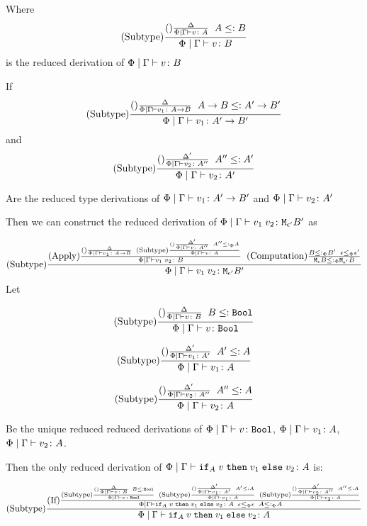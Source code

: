 {    Where $$\edeltavrule{\P}{\G}{v}{A}{B}$$ is the reduced derivation of $\gpetyperelation{v}{B}$
    
    If 
    $$
        \edeltavrule{\P}{\G}{v_1}{\ab}{\fntype{A'}{B'}}
    $$ and $$
        \edeltavruleprime{\P}{\G}{v_2}{A''}{A'}
    $$

    Are the reduced type derivations of $\gpetyperelation{v_1}{\fntype{A'}{B'}}$ and $\gpetyperelation{v_2}{A'}$



    Then we can construct the reduced derivation of $\gpetyperelation{\apply{v_1}{v_2}}{\M{\e'}{B'}}$ as

    $$
        \treerule{Subtype}{
            \treerule{Apply}{
                \treerule{}{\D}{
                    \gpetyperelation{v_1}{\ab}
                }
                \s\s
                \treerule{Subtype}{
                    \treerule{}{\D'}{
                        \gpetyperelation{v}{A''}
                    } \s\s A'' \subtypep A
                }
                {\gpetyperelation{v}{A}}
            }{
                \gpetyperelation{\apply{v_1}{v_2}}{B}
            }
            \s\s
            \treerule{Computation}{         
                B \subtypep B'
            \s\s
            \e \subeffectp \e'}{
                \meb\subtypep\M{\e'}{B}
            }
        }{
            \gpetyperelation{\apply{v_1}{v_2}}{\M{\e'}{B'}}
        }
    $$
    Let

    \begin{equation}
        \edeltavrule{\P}{\G}{v}{B}{\B}
    \end{equation}

    \begin{equation}
        \edeltavruleprime{\P}{\G}{v_1}{A'}{A}
    \end{equation}

    \begin{equation}
        \edeltavruleprimeprime{\P}{\G}{v_2}{A''}{A}
    \end{equation}

    Be the unique reduced reduced derivations of $\gpetyperelation{v}{\B}$, $\gpetyperelation{v_1}{A}$, $\gpetyperelation{v_2}{A}$.

    Then the only reduced derivation of $\gpetyperelation{\pifthenelse{A}{v}{v_1}{v_2}}{A}$ is:

    \begin{equation}
        \treerule{Subtype}{
            \treerule{If}{
                \edeltavrule{\P}{\G}{v}{B}{\B}
                \s\s
                \edeltavruleprime{\P}{\G}{v_1}{A'}{A}
                \s\s
                \edeltavruleprimeprime{\P}{\G}{v_2}{A''}{A}
            }{\gpetyperelation{\pifthenelse{A}{v}{v_1}{v_2}}{A}\s\s \e\subeffectp \e\s\s A \subtypep A}
        }{\gpetyperelation{\pifthenelse{A}{v}{v_1}{v_2}}{A}}
    \end{equation}

}
